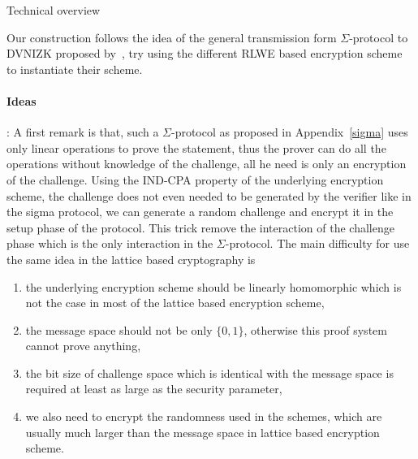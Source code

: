\begin{subsection}{Technical overview}

  Our construction follows the idea of the general transmission form $\Sigma$-protocol to DVNIZK proposed by~\cite{DBLP:conf/pkc/ChaidosG15},
  try using the different RLWE based encryption scheme to instantiate their scheme.

  \paragraph{Ideas}: A first remark is that, such a $\Sigma$-protocol as proposed in Appendix~\ref{sigma} uses only linear operations to prove the statement,
    thus the prover can do all the operations without knowledge of the challenge,
    all he need is only an encryption of the challenge.
    Using the IND-CPA property of the underlying encryption scheme,
    the challenge does not even needed to be generated by the verifier like in the sigma protocol,
    we can generate a random challenge and encrypt it in the setup phase of the protocol.
    This trick remove the interaction of the challenge phase which is the only interaction in the $\Sigma$-protocol.
    The main difficulty for use the same idea in the lattice based cryptography is
    \begin{enumerate}
    \item the underlying encryption scheme should be linearly homomorphic which is not the case in most of the lattice based encryption scheme,
    \item the message space should not be only $\{0,1\}$, otherwise this proof system cannot prove anything,
    \item the bit size of challenge space which is identical with the message space is required at least as large as the security parameter,
    \item we also need to encrypt the randomness used in the schemes, which are usually much larger than the message space in lattice based encryption scheme.
    \end{enumerate}  
  
\end{subsection}




